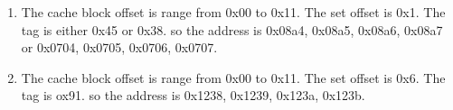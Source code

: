 \documentclass{article}
\begin{document}
\begin{enumerate}[label=\textbf{\Alph*.}]
	\item The cache block offset is range from 0x00 to 0x11.
	The set offset is 0x1.
	The tag is either 0x45 or 0x38.
	so the address is 0x08a4, 0x08a5, 0x08a6, 0x08a7 or 0x0704, 0x0705, 0x0706, 0x0707.
	\item The cache block offset is range from 0x00 to 0x11.
	The set offset is 0x6.
	The tag is ox91.
	so the address is 0x1238, 0x1239, 0x123a, 0x123b.
	\end{enumerate}
\end{document}
